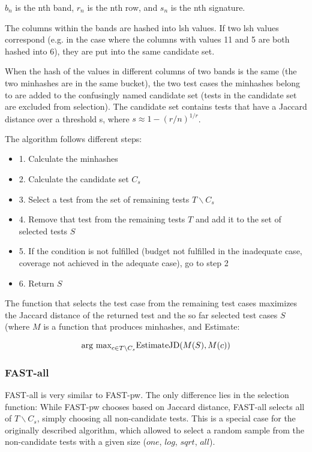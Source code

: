 $b_n$ is the nth band, $r_n$ is the nth row, and $s_n$ is the nth
signature.

The columns within the bands are hashed into lsh values. If two lsh
values correspond (e.g. in the case where the columns with values 11
and 5 are both hashed into 6), they are put into the same candidate set.

When the hash of the values in different columns of two bands is the
same (the two minhashes are in the same bucket), the two test cases the
minhashes belong to are added to the confusingly named candidate set
(tests in the candidate set are excluded from selection). The candidate
set contains tests that have a Jaccard distance over a threshold s,
where $s \approx 1-(r/n)^{1/r}$.

The algorithm follows different steps:

\begin{itemize}
	\item[] 1. Calculate the minhashes
	\item[] 2. Calculate the candidate set $C_s$
	\item[] 3. Select a test from the set of remaining tests $T \backslash C_s$
	\item[] 4. Remove that test from the remaining tests $T$ and add it to the set of selected tests $S$
	\item[] 5. If the condition is not fulfilled (budget not fulfilled in the inadequate case, coverage not achieved in the adequate case), go to step 2
	\item[] 6. Return $S$
\end{itemize}


The function that selects the test case from the remaining test cases
maximizes the Jaccard distance of the returned test and the so far
selected test cases $S$ (where $M$ is a function that produces minhashes, and Estimate:

$$ \hbox{arg max}_{c \in T \backslash C_s} \hbox{EstimateJD}(M(S), M(c))$$

\subsubsection{FAST-all}

FAST-all is very similar to FAST-pw. The only difference lies in the
selection function: While FAST-pw chooses based on Jaccard distance,
FAST-all selects all of $T \backslash C_s$, simply choosing all
non-candidate tests. This is a special case for the originally described
algorithm, which allowed to select a random sample from the non-candidate
tests with a given size ($one$, $log$, $sqrt$, $all$).

